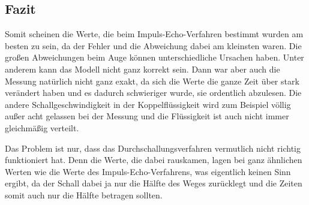 \subsection{Fazit}
Somit scheinen die Werte, die beim Impuls-Echo-Verfahren bestimmt wurden am besten zu sein, da der Fehler und die Abweichung dabei am kleinsten waren. 
Die großen Abweichungen beim Auge können unterschiedliche Ursachen haben. Unter anderem kann das Modell nicht ganz korrekt sein. Dann war aber auch die Messung natürlich nicht ganz exakt, da sich die Werte die ganze Zeit über stark verändert haben und es dadurch schwieriger wurde, sie ordentlich abzulesen. Die andere Schallgeschwindigkeit in der Koppelflüssigkeit wird zum Beispiel völlig außer acht gelassen bei der Messung und die Flüssigkeit ist auch nicht immer gleichmäßig verteilt.

Das Problem ist nur, dass das Durchschallungsverfahren vermutlich nicht richtig funktioniert hat. Denn die Werte, die dabei rauskamen, lagen bei ganz ähnlichen Werten wie die Werte des Impuls-Echo-Verfahrens, was eigentlich keinen Sinn ergibt, da der Schall dabei ja nur die Hälfte des Weges zurücklegt und die Zeiten somit auch nur die Hälfte betragen sollten. 
